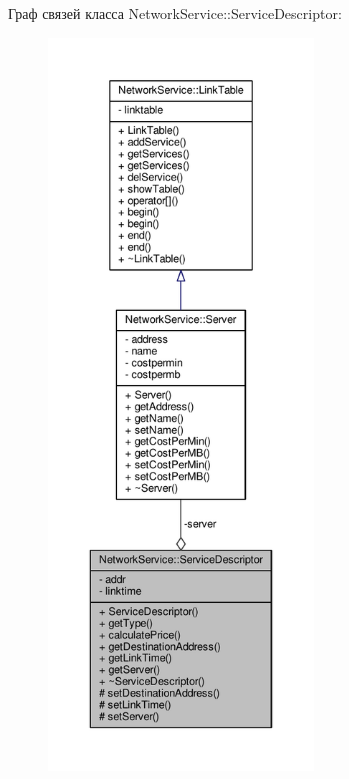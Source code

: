 Граф связей класса Network\+Service\+:\+:Service\+Descriptor\+:\nopagebreak
\begin{figure}[H]
\begin{center}
\leavevmode
\includegraphics[height=550pt]{class_network_service_1_1_service_descriptor__coll__graph}
\end{center}
\end{figure}
